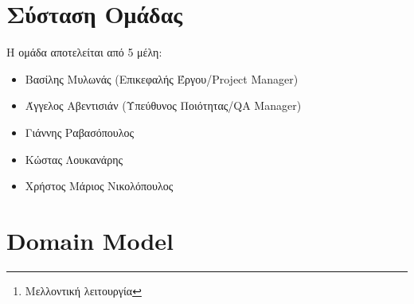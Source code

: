 \documentclass[11pt]{article}
\begin{document}

\newpage

\begin{abstract}
    Ανάπτυξη συστήματος και συνοδεύουσας εφαρμογής για την εύρεση/ενοικίαση
    θέσεων στάθμευσης και την διευκόλυνση συνεπιβίβασης σε κοινές διαδρομές.
    Η εφαρμογή εγκαθισταται σε κινητές συσκευές και παρέχει ζωντανή πληροφόρηση
    αντλώντας πληροφορίες από τους χρήστες, στατιστικά μοντέλα και από δίκτυα
    αισθητήρων\footnote{Μελλοντική λειτουργία} όπου αυτό είναι δυνατό. Η
    εφαρμογή απευθύνεται αμφότερα σε οδηγούς αυτοκινήτων αλλά και σε πεζούς.
    Στόχος είναι η καλύτερη αξιοποίηση του οδικού δικτύου και η μείωση της
    κυκλοφοριακής συμφόρησης σε αστικές περιοχές.
\end{abstract}

\newpage

\tableofcontents

\newpage



\newpage

\section{Σύσταση Ομάδας}

Η ομάδα αποτελείται από 5 μέλη:

\begin{itemize}
    \item Βασίλης Μυλωνάς (Επικεφαλής Έργου/Project Manager)
    \item Άγγελος Αβεντισιάν (Υπεύθυνος Ποιότητας/QA Manager)
    \item Γιάννης Ραβασόπουλος
    \item Κώστας Λουκανάρης
    \item Χρήστος Μάριος Νικολόπουλος
\end{itemize}

\newpage

\section{Domain Model}
\end{document}
